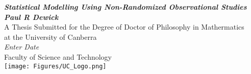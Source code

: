 %
%
\begin{titlepage}
\begin{center}
\Huge \textbf{\emph{Statistical Modelling Using Non-Randomized Observational Studies}}
\\[30mm]
\LARGE \textbf{\emph{Paul R Dewick}} \\[50mm]
\large A Thesis Submitted for the Degree of Doctor of Philosophy in Mathermatics \\ at the University of Canberra\\[30mm]
\emph{Enter Date} \\[10mm]
Faculty of Science and Technology\\[10mm]
%
\texttt{[image: Figures/UC\_Logo.png]}

\end{center}

%
%
\end{titlepage}

